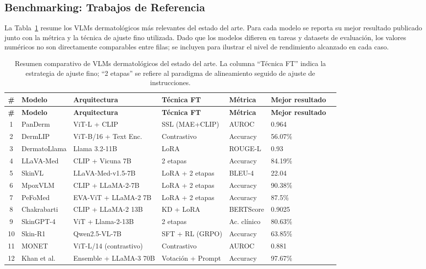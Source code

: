 \documentclass[11pt, a4paper]{article}
\begin{document}
\subsection{Benchmarking: Trabajos de Referencia}

La Tabla~\ref{tab:sota} resume los VLMs dermatológicos más relevantes del estado del arte. Para cada modelo se reporta su mejor resultado publicado junto con la métrica y la técnica de ajuste fino utilizada. Dado que los modelos difieren en tareas y datasets de evaluación, los valores numéricos no son directamente comparables entre filas; se incluyen para ilustrar el nivel de rendimiento alcanzado en cada caso.

\begin{longtable}{@{}cllp{2.5cm}lll@{}}
\caption{Resumen comparativo de VLMs dermatológicos del estado del arte. La columna ``Técnica FT'' indica la estrategia de ajuste fino; ``2 etapas'' se refiere al paradigma de alineamiento seguido de ajuste de instrucciones.} \label{tab:sota} \\
\toprule
\textbf{\#} & \textbf{Modelo} & \textbf{Arquitectura} & \textbf{Técnica FT} & \textbf{Métrica} & \textbf{Mejor resultado} \\
\midrule
\endfirsthead
\toprule
\textbf{\#} & \textbf{Modelo} & \textbf{Arquitectura} & \textbf{Técnica FT} & \textbf{Métrica} & \textbf{Mejor resultado} \\
\midrule
\endhead
1 & PanDerm & ViT-L + CLIP & SSL (MAE+CLIP) & AUROC & 0.964 \\
2 & DermLIP & ViT-B/16 + Text Enc. & Contrastivo & Accuracy & 56.07\% \\
3 & DermatoLlama & Llama 3.2-11B & LoRA & ROUGE-L & 0.93 \\
4 & LLaVA-Med & CLIP + Vicuna 7B & 2 etapas & Accuracy & 84.19\% \\
5 & SkinVL & LLaVA-Med-v1.5-7B & LoRA + 2 etapas & BLEU-4 & 22.04 \\
6 & MpoxVLM & CLIP + LLaMA-2-7B & LoRA + 2 etapas & Accuracy & 90.38\% \\
7 & PeFoMed & EVA-ViT + LLaMA-2 7B & LoRA + 2 etapas & Accuracy & 87.5\% \\
8 & Chakrabarti & CLIP + LLaMA-2 13B & KD + LoRA & BERTScore & 0.9025 \\
9 & SkinGPT-4 & ViT + Llama-2-13B & 2 etapas & Ac. clínico & 80.63\% \\
10 & Skin-R1 & Qwen2.5-VL-7B & SFT + RL (GRPO) & Accuracy & 63.85\% \\
11 & MONET & ViT-L/14 (contrastivo) & Contrastivo & AUROC & 0.881 \\
12 & Khan et al. & Ensemble + LLaMA-3 70B & Votación + Prompt & Accuracy & 97.67\% \\
\bottomrule
\end{longtable}
\end{document}
